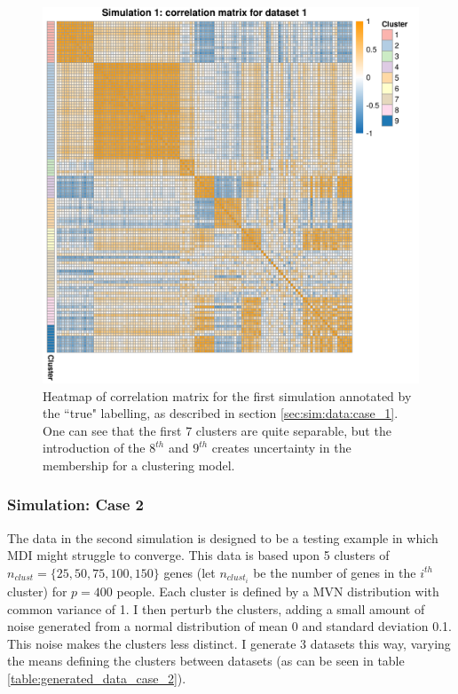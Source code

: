 \documentclass[14pt]{extarticle} %
\begin{document}
	\begin{figure}[!htb]
		\centering
		\includegraphics[scale=0.65]{Images/Gen_data/Case_1/cor_matrix_dataset_1.png}
		\caption{Heatmap of correlation matrix for the first simulation annotated by the ``true" labelling, as described in section \ref{sec:sim:data:case_1}. One can see that the first 7 clusters are quite separable, but the introduction of the $8^{th}$ and $9^{th}$ creates uncertainty in the membership for a clustering model.}
		\label{fig:cor_matrix_1_sim_case_1}
	\end{figure}
	
	\subsubsection{Simulation: Case 2} \label{sec:sim:data:case_2}
	The data in the second simulation is designed to be a testing example in which MDI might struggle to converge. This data is based upon 5 clusters of $n_{clust}=\{25, 50, 75, 100, 150\}$ genes (let $n_{clust_i}$ be the number of genes in the $i^{th}$ cluster) for $p=400$ people. Each cluster is defined by a MVN distribution with common variance of 1. I then perturb the clusters, adding a small amount of noise generated from a normal distribution of mean 0 and standard deviation 0.1. This noise makes the clusters less distinct. I generate 3 datasets this way, varying the means defining the clusters between datasets (as can be seen in table \ref{table:generated_data_case_2}).
	
\end{document}
